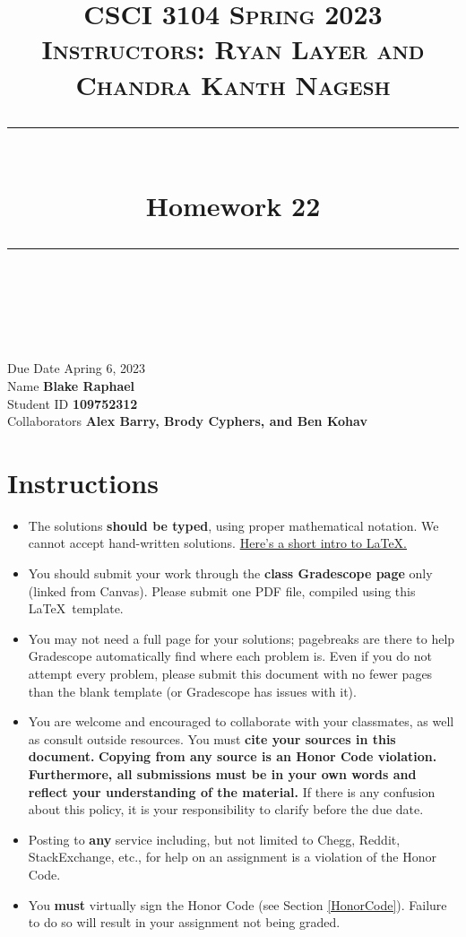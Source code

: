 \documentclass[11pt]{article}
\title{
\normalfont \normalsize 
\textsc{CSCI 3104 Spring 2023 \\ 
Instructors: Ryan Layer and Chandra Kanth Nagesh} \\
[10pt] 
\rule{\linewidth}{0.5pt} \\[6pt] 
\huge Homework 22 \\
\rule{\linewidth}{2pt}  \\[10pt]
}
\author{}
\date{}
\theoremstyle{definition}
\theoremstyle{definition}
\theoremstyle{definition}
\begin{document}

\maketitle


\noindent
Due Date \dotfill Apring 6, 2023 \\
Name \dotfill \textbf{Blake Raphael} \\
Student ID \dotfill \textbf{109752312} \\
Collaborators \dotfill \textbf{Alex Barry, Brody Cyphers, and Ben Kohav}

\tableofcontents

\section{Instructions}
 \begin{itemize}
	\item The solutions \textbf{should be typed}, using proper mathematical notation. We cannot accept hand-written solutions. \href{http://ece.uprm.edu/~caceros/latex/introduction.pdf}{Here's a short intro to \LaTeX.}
	\item You should submit your work through the \textbf{class Gradescope page} only (linked from Canvas). Please submit one PDF file, compiled using this \LaTeX \ template.
	\item You may not need a full page for your solutions; pagebreaks are there to help Gradescope automatically find where each problem is. Even if you do not attempt every problem, please submit this document with no fewer pages than the blank template (or Gradescope has issues with it).

	\item You are welcome and encouraged to collaborate with your classmates, as well as consult outside resources. You must \textbf{cite your sources in this document.} \textbf{Copying from any source is an Honor Code violation. Furthermore, all submissions must be in your own words and reflect your understanding of the material.} If there is any confusion about this policy, it is your responsibility to clarify before the due date. 

	\item Posting to \textbf{any} service including, but not limited to Chegg, Reddit, StackExchange, etc., for help on an assignment is a violation of the Honor Code.

	\item You \textbf{must} virtually sign the Honor Code (see Section \ref{HonorCode}). Failure to do so will result in your assignment not being graded.
\end{itemize}
\end{document}

